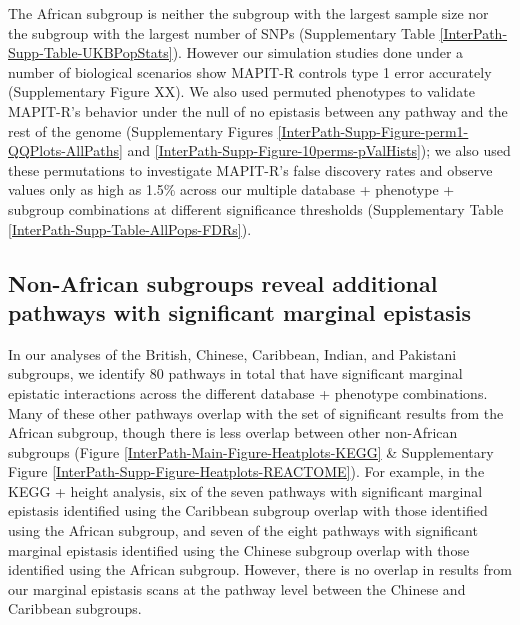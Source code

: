 \documentclass[12pt,a4paper]{article}
\begin{document}
The African subgroup is neither the subgroup with the largest sample size nor the subgroup with the largest number of SNPs (Supplementary Table \ref{InterPath-Supp-Table-UKBPopStats}). However our simulation studies done under a number of biological scenarios show MAPIT-R controls type 1 error accurately (Supplementary Figure XX). We also used permuted phenotypes to validate MAPIT-R's behavior under the null of no epistasis between any pathway and the rest of the genome (Supplementary Figures \ref{InterPath-Supp-Figure-perm1-QQPlots-AllPaths} and \ref{InterPath-Supp-Figure-10perms-pValHists}); we also used these permutations to investigate MAPIT-R's false discovery rates and observe values only as high as 1.5\% across our multiple database + phenotype + subgroup combinations at different significance thresholds (Supplementary Table \ref{InterPath-Supp-Table-AllPops-FDRs}).

\subsection{Non-African subgroups reveal additional pathways with significant marginal epistasis}

In our analyses of the British, Chinese, Caribbean, Indian, and Pakistani subgroups, we identify 80 pathways in total that have significant marginal epistatic interactions across the different database + phenotype combinations. Many of these other pathways overlap with the set of significant results from the African subgroup, though there is less overlap between other non-African subgroups (Figure \ref{InterPath-Main-Figure-Heatplots-KEGG} \& Supplementary Figure \ref{InterPath-Supp-Figure-Heatplots-REACTOME}). For example, in the KEGG + height analysis, six of the seven pathways with significant marginal epistasis identified using the Caribbean subgroup overlap with those identified using the African subgroup, and seven of the eight pathways with significant marginal epistasis identified using the Chinese subgroup overlap with those identified using the African subgroup. However, there is no overlap in results from our marginal epistasis scans at the pathway level between the Chinese and Caribbean subgroups.
\end{document}
